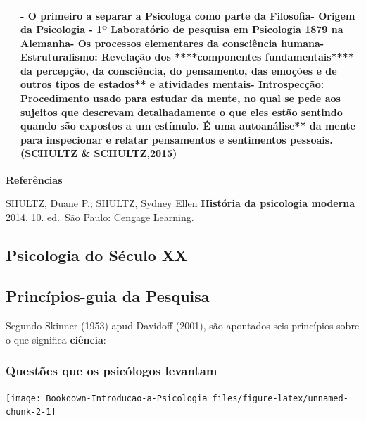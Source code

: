 \documentclass[
]{book}
\begin{document}
\begin{longtable}[]{@{}
  >{\centering\arraybackslash}p{}
  >{\raggedright\arraybackslash}p{}@{}}
\toprule()
\endhead
& - \textbf{O primeiro a separar a Psicologa} como parte da Filosofia- Origem da Psicologia - 1º Laboratório de pesquisa em Psicologia 1879 na Alemanha- Os processos elementares da consciência humana- \textbf{Estruturalismo}: Revelação dos ****componentes fundamentais**** da \textbf{percepção}, da \textbf{consciência}, do \textbf{pensamento}, das \textbf{emoções} e de \textbf{outros tipos de }estados** e \textbf{atividades} mentais\textbf{- }Introspecção\textbf{: Procedimento usado para estudar da mente, no qual se pede aos sujeitos que descrevam detalhadamente o que eles estão sentindo quando são expostos a um estímulo. É uma }autoanálise** da mente para \textbf{inspecionar} e \textbf{relatar} \textbf{pensamentos} e \textbf{sentimentos} pessoais. (SCHULTZ \& SCHULTZ,2015) \\
\bottomrule()
\end{longtable}

\textbf{Referências}

SHULTZ, Duane P.; SHULTZ, Sydney Ellen \textbf{História da psicologia moderna} 2014. 10. ed.~São Paulo: Cengage Learning.

\hypertarget{psicologia-do-suxe9culo-xx}{%
\subsection{Psicologia do Século XX}\label{psicologia-do-suxe9culo-xx}}

\hypertarget{princuxedpios-guia-da-pesquisa}{%
\subsection{Princípios-guia da Pesquisa}\label{princuxedpios-guia-da-pesquisa}}

Segundo Skinner (1953) apud Davidoff (2001), são apontados seis princípios sobre o que significa \textbf{ciência}:

\hypertarget{questuxf5es-que-os-psicuxf3logos-levantam}{%
\subsubsection{Questões que os psicólogos levantam}\label{questuxf5es-que-os-psicuxf3logos-levantam}}

\texttt{[image: Bookdown-Introducao-a-Psicologia\_files/figure-latex/unnamed-chunk-2-1]}
\end{document}
